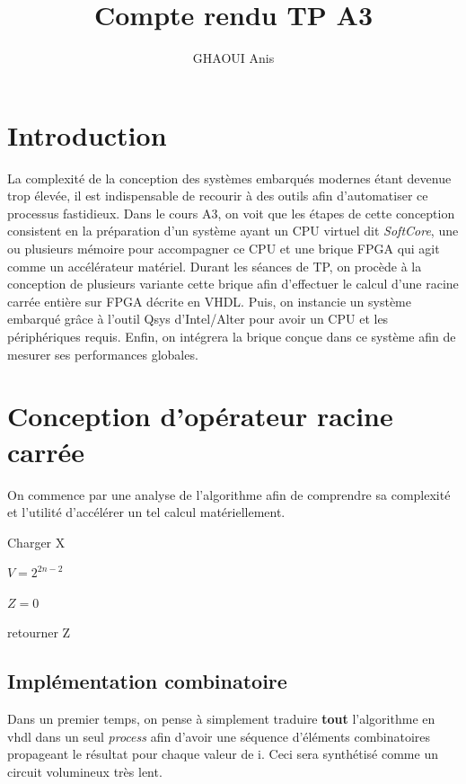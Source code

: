 \documentclass[12pt,a4paper]{article}
\author{GHAOUI Anis}
\title{Compte rendu TP A3}
\begin{document}
\section{Introduction}
La complexité de la conception des systèmes embarqués modernes étant devenue trop élevée, il est indispensable de recourir à des outils afin d'automatiser ce processus fastidieux. Dans le cours A3, on voit que les étapes de cette conception consistent en la préparation d'un système ayant un CPU virtuel dit \textit{SoftCore}, une ou plusieurs mémoire pour accompagner ce CPU et une brique FPGA qui agit comme un accélérateur matériel. Durant les séances de TP, on procède à la conception de plusieurs variante cette brique afin d'effectuer le calcul d'une racine carrée entière sur FPGA décrite en VHDL. Puis, on instancie un système embarqué grâce à l'outil Qsys d'Intel/Alter pour avoir un CPU et les périphériques requis. Enfin, on intégrera la brique conçue dans ce système afin de mesurer ses performances globales.

\section{Conception d'opérateur racine carrée}
On commence par une analyse de l'algorithme afin de comprendre sa complexité et l'utilité d'accélérer un tel calcul matériellement.

\begin{algorithm}[H]
	Charger X
	
	$V = 2^{2n-2}$
	
	$Z=0$
	
	retourner Z
\end{algorithm}

\subsection{Implémentation combinatoire}
Dans un premier temps, on pense à simplement traduire \textbf{tout} l'algorithme en vhdl dans un seul \textit{process} afin d'avoir une séquence d'éléments combinatoires propageant le résultat pour chaque valeur de i. Ceci sera synthétisé comme un circuit volumineux très lent.
\end{document}

